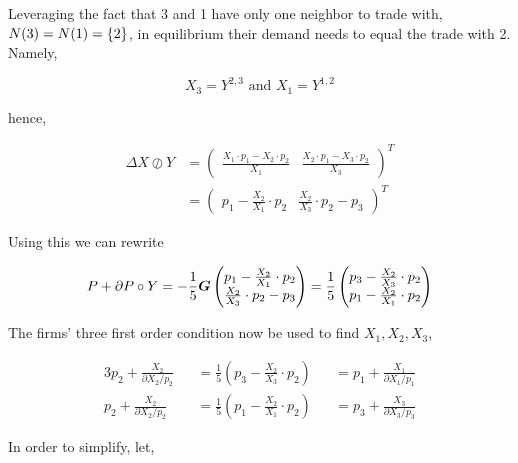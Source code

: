 Leveraging the fact that 3 and 1 have only one neighbor to trade with, $N(3) = N(1) = \left\{2\right\}$, in equilibrium their demand needs to equal the trade with 2. Namely,

\begin{equation}
  X_3 = Y^{2, 3} \text{ and } X_1 = Y^{1, 2}
\end{equation}

hence,

\begin{equation}
  \begin{split}
    \Delta X \oslash Y &= \begin{pmatrix}
      \frac{X_1 \cdot p_1 - X_2 \cdot p_2}{X_1} &
      \frac{X_2 \cdot p_1 - X_3 \cdot p_2}{X_3}
    \end{pmatrix}^{T} \\
    &= \begin{pmatrix}
      p_1 - \frac{X_2}{X_1} \cdot p_2 &
      \frac{X_2}{X_3} \cdot p_2 - p_3
    \end{pmatrix}^{T}
  \end{split}
\end{equation}

Using this we can rewrite

\begin{equation}
  P + \partial P \circ Y = - \frac{1}{5} \bm{G} \begin{pmatrix}
    p_1 - \frac{X_2}{X_1} \cdot p_2 \\
    \frac{X_2}{X_3} \cdot p_2 - p_3
  \end{pmatrix} = \frac{1}{5} \begin{pmatrix}
    p_3 - \frac{X_2}{X_3} \cdot p_2 \\
    p_1 - \frac{X_2}{X_1} \cdot p_2
  \end{pmatrix}
\end{equation}

The firms' three first order condition now be used to find $X_1, X_2, X_3$,

\begin{alignat*}{3}
  p_2 + \frac{X_2}{\partial X_2 / p_2} &  & = \frac{1}{5} \left( p_3 - \frac{X_2}{X_3} \cdot p_2  \right) &  & = p_1 + \frac{X_1}{\partial X_1 / p_1} \\
  p_2 + \frac{X_2}{\partial X_2 / p_2} &  & = \frac{1}{5} \left( p_1 - \frac{X_2}{X_1} \cdot p_2  \right) &  & = p_3 + \frac{X_3}{\partial X_3 / p_3}
\end{alignat*}

In order to simplify, let,

